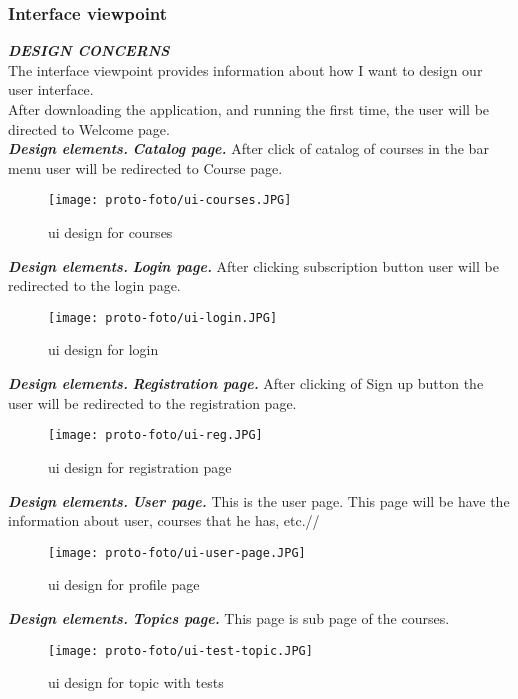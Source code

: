 \documentclass{scrartcl}
\begin{document}
\subsubsection{Interface viewpoint}
\textbf{\textit{DESIGN CONCERNS}}
\\
The interface viewpoint provides information about how I want to design our user interface. \\

After downloading the application, and running the first time, the user will be directed to Welcome page.\\

\textbf{\textit{Design elements.}}
\textbf{\textit{Catalog page.}}
After click of catalog of courses in the bar menu user will be redirected to Course page.

\begin{figure}[H]
\centering
\texttt{[image: proto-foto/ui-courses.JPG]}
\caption{ui design for courses}
\label{welcome page}
\end{figure}

\newpage
\textbf{\textit{Design elements.}}
\textbf{\textit{Login page. }}
After clicking subscription button user will be redirected to the login page.
\begin{figure}[H]
\centering
\texttt{[image: proto-foto/ui-login.JPG]}
\caption{ui design for login}
\label{login page}
\end{figure}

\newpage
\textbf{\textit{Design elements.}}
\textbf{\textit{Registration page.}}
After clicking of Sign up button the user will be redirected to the registration page.\\
\begin{figure}[H]
\centering
\texttt{[image: proto-foto/ui-reg.JPG]}
\caption{ui design for registration page}
\label{registration page}
\end{figure}

\newpage
\textbf{\textit{Design elements.}}
\textbf{\textit{User page.}}
This is the user page. This page will be have the information about user, courses that he has, etc.//
\begin{figure}[H]
\centering
\texttt{[image: proto-foto/ui-user-page.JPG]}
\caption{ui design for profile page}
\label{user page}
\end{figure}

\newpage
\textbf{\textit{Design elements.}}
\textbf{\textit{Topics page.}}
This page is sub page of the courses.
\begin{figure}[H]
\centering
\texttt{[image: proto-foto/ui-test-topic.JPG]}
\caption{ui design for topic with tests}
\label{topics page}
\end{figure}
\end{document}
